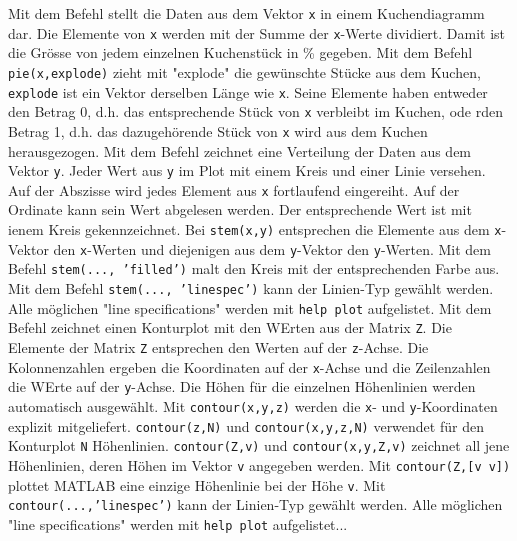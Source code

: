 \newline\newline
Mit dem Befehl  stellt die Daten aus dem Vektor \texttt{x} in einem Kuchendiagramm dar. Die Elemente von \texttt{x} werden mit der Summe der \texttt{x}-Werte dividiert. Damit ist die Grösse von jedem einzelnen Kuchenstück in \% gegeben. Mit dem Befehl {\color{red}\texttt{pie(x,explode)}} zieht mit "explode" die gewünschte Stücke aus dem Kuchen, \texttt{explode} ist ein Vektor derselben Länge wie \texttt{x}. Seine Elemente haben entweder den Betrag 0, d.h. das entsprechende Stück von \texttt{x} verbleibt im Kuchen, ode rden Betrag 1, d.h. das dazugehörende Stück von \texttt{x} wird aus dem Kuchen herausgezogen.
\newline\newline
Mit dem Befehl  zeichnet eine Verteilung der Daten aus dem Vektor \texttt{y}. Jeder Wert aus \texttt{y} im Plot mit einem Kreis und einer Linie versehen. Auf der Abszisse wird jedes Element aus \texttt{x} fortlaufend eingereiht. Auf der Ordinate kann sein Wert abgelesen werden. Der entsprechende Wert ist mit ienem Kreis gekennzeichnet. Bei {\color{red}\texttt{stem(x,y)}} entsprechen die Elemente aus dem \texttt{x}-Vektor den \texttt{x}-Werten und diejenigen aus dem \texttt{y}-Vektor den \texttt{y}-Werten. Mit dem Befehl {\color{red}\texttt{stem(..., 'filled')}} malt den Kreis mit der entsprechenden Farbe aus. Mit dem Befehl {\color{red}\texttt{stem(..., 'linespec')}} kann der Linien-Typ gewählt werden. Alle möglichen "line specifications" werden mit {\color{red}\texttt{help plot}} aufgelistet.    
\newline\newline
Mit dem Befehl  zeichnet einen Konturplot mit den WErten aus der Matrix \texttt{Z}. Die Elemente der Matrix \texttt{Z} entsprechen den Werten auf der \texttt{z}-Achse. Die Kolonnenzahlen ergeben die Koordinaten auf der \texttt{x}-Achse und die Zeilenzahlen die WErte auf der \texttt{y}-Achse. Die Höhen für die einzelnen Höhenlinien werden automatisch ausgewählt. Mit {\color{red}\texttt{contour(x,y,z)}} werden die \texttt{x}- und \texttt{y}-Koordinaten explizit mitgeliefert. {\color{red}\texttt{contour(z,N)}} und {\color{red}\texttt{contour(x,y,z,N)}} verwendet für den Konturplot \texttt{N} Höhenlinien. {\color{red}\texttt{contour(Z,v)}} und {\color{red}\texttt{contour(x,y,Z,v)}} zeichnet all jene Höhenlinien, deren Höhen im Vektor \texttt{v} angegeben werden. Mit {\color{red}\texttt{contour(Z,[v v])}} plottet MATLAB eine einzige Höhenlinie bei der Höhe \texttt{v}. Mit {\color{red}\texttt{contour(...,'linespec')}} kann der Linien-Typ gewählt werden. Alle möglichen "line specifications" werden mit {\color{red}\texttt{help plot}} aufgelistet...  